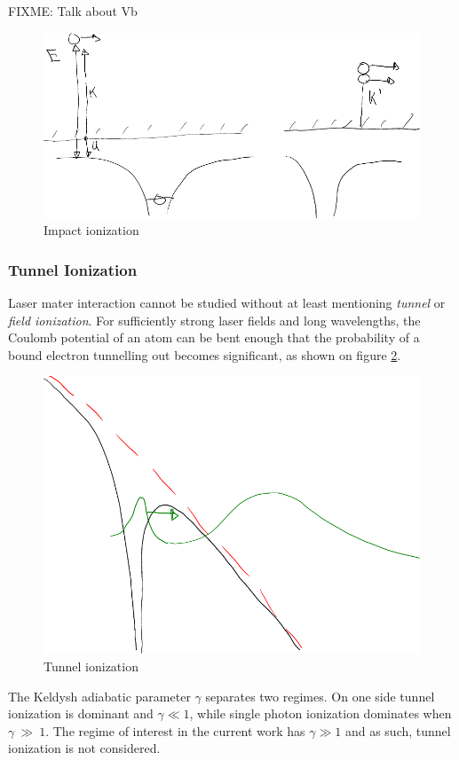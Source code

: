 FIXME: Talk about Vb

\begin{figure}
 \centering
 \includegraphics[width=0.76\columnwidth]{figures/mockups/ionization_impact}
 \caption{Impact ionization}
 \label{fig:ionization:impact}
\end{figure}


\subsubsection{Tunnel Ionization}
Laser mater interaction cannot be studied without at least mentioning
\textit{tunnel} or \textit{field ionization}. For sufficiently strong laser
fields and long wavelengths, the Coulomb potential of an atom can be bent enough
that the probability of a bound electron tunnelling out becomes significant, as
shown on figure \ref{fig:ionization:tunnel}.

\begin{figure}
 \centering
 \includegraphics[width=0.76\columnwidth]{figures/mockups/ionization_tunnel}
 \caption{Tunnel ionization}
 \label{fig:ionization:tunnel}
\end{figure}

The Keldysh adiabatic parameter $\gamma$ separates two regimes\cite{Fennel2010}.
On one side tunnel ionization is dominant and $\gamma \ll 1$, while single
photon ionization dominates when $\gamma~\gg~1$. The regime of interest in the
current work has $\gamma \gg 1$ and as such, tunnel ionization is not
considered.



